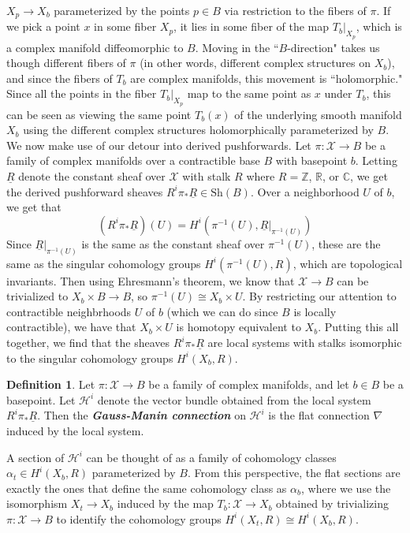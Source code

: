 \documentclass[psamsfonts, 12pt]{amsart}
\theoremstyle{definition}
\newtheorem{defn}[thm]{Definition}
\theoremstyle{remark}
\newcommand{\R}{\mathbb{R}}
\newcommand{\ib}[1]{\textbf{\textit{#1}}}
\newcommand{\Z}{\mathbb{Z}}
\newcommand{\C}{\mathbb{C}}
\newcommand{\inv}{^{-1}}
\begin{document}
$X_p \to X_b$ parameterized by the points $p \in B$ via restriction to the fibers
of $\pi$. If we pick a point $x$ in some fiber $X_p$, it lies in some fiber
of the map $T_b\vert_{X_p}$, which is a complex manifold diffeomorphic to $B$.
Moving in the ``$B$-direction" takes us though different fibers of $\pi$ (in other
words, different complex structures on $X_b$), and since the fibers of $T_b$ are
complex manifolds, this movement is ``holomorphic." Since all the points in the
fiber  $T_b\vert_{X_p}$ map to the same point as $x$ under $T_b$, this can be seen as
viewing the same point $T_b(x)$ of the underlying smooth manifold $X_b$ using the
different complex structures holomorphically parameterized by $B$. \\

We now make use of our detour into derived pushforwards. Let $\pi : \mathcal{X} \to B$
be a family of complex manifolds over a contractible base $B$ with basepoint $b$.
Letting $\underline{R}$ denote the constant sheaf over $\mathcal{X}$ with stalk
$R$ where $R = \Z$, $\R$, or $\C$, we get the derived pushforward
sheaves $R^i\pi_*\underline{R} \in \mathrm{Sh}(B)$. Over a neighborhood $U$ of $b$,
we get that
\[
(R^i\pi_*\underline{R})(U) = H^i(\pi\inv(U),\underline{R}\vert_{\pi\inv(U)})
\]
Since $\underline{R}\vert_{\pi\inv(U)}$ is the same as the constant sheaf
over $\pi\inv(U)$, these are the same as the singular cohomology groups
$H^i(\pi\inv(U),R)$, which are topological invariants.
Then using Ehresmann's theorem, we know that $\mathcal{X} \to B$ can be
trivialized to $X_b \times B \to B$, so $\pi\inv(U) \cong X_b \times U$.
By restricting our attention to contractible neighbrhoods $U$ of $b$
(which we can do since $B$ is locally contractible), we have that
$X_b \times U$ is homotopy equivalent to $X_b$. Putting this all together, we
find that the sheaves $R^i\pi_*\underline{R}$ are local systems with
stalks isomorphic to the singular cohomology groups $H^i(X_b,R)$.
%
\begin{defn}
Let $\pi : \mathcal{X} \to B$ be a family of complex manifolds, and let $b \in B$
be a basepoint. Let $\mathcal{H}^i$ denote the vector bundle obtained from the local
system $R^i\pi_*\underline{R}$. Then the \ib{Gauss-Manin connection} on
$\mathcal{H}^i$ is the flat connection $\nabla$ induced by the local system.
\end{defn}
%
A section of $\mathcal{H}^i$ can be thought of as a family of cohomology classes
$\alpha_t \in H^i(X_b,R)$ parameterized by $B$. From this perspective, the flat
sections are exactly the ones that define the same cohomology class as $\alpha_b$,
where we use the isomorphism $X_t \to X_b$ induced by the map
$T_b : \mathcal{X} \to X_b$ obtained by trivializing $\pi : \mathcal{X} \to B$
to identify the cohomology groups $H^i(X_t,R) \cong H^i(X_b,R)$.
%
\newpage
%
\nocite{*}
%
\printbibliography
%
\end{document}
